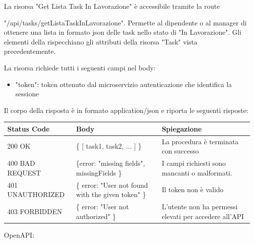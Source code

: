 \documentclass{report}
\begin{document}
La risorsa "Get Lista Task In Lavorazione" è accessibile tramite la route

 "/api/tasks/getListaTaskInLavorazione". Permette al dipendente o al manager di ottenere una lista in formato json delle task nello stato di "In Lavorazione". Gli elementi della rispecchiano gli attributi della risorsa "Task" vista precedentemente.

La risorsa richiede tutti i seguenti campi nel body:
\begin{itemize}
	\item "token": token ottenuto dal microservizio autenticazione che identifica la sessione
\end{itemize}

Il corpo della risposta è in formato application/json e riporta le seguenti risposte:

\begin{center} %
	\centering
	\begin{tabular}{ |p{4cm}|p{4cm}|p{4cm}| }
		\hline
		\centering Status Code & \qquad\qquad\quad Body & \qquad\quad Spiegazione\\ %
		\hline
		200 OK & \{ [ task1, task2, ... ] \}  & La procedura è terminata con successo	\\ 
		\hline
		400 BAD REQUEST & \{error: "missing fields", missingFields \} & I campi richiesti sono mancanti o malformati. \\
		\hline
		401 UNAUTHORIZED & \{ error: "User not found with the given token" \} & Il token non è valido \\
		\hline
		403 FORBIDDEN & \{ error: "User not authorized" \} &  L'utente non ha permessi elevati per accedere all'API \\
		\hline
	\end{tabular}
\end{center}

OpenAPI:
\end{document}
